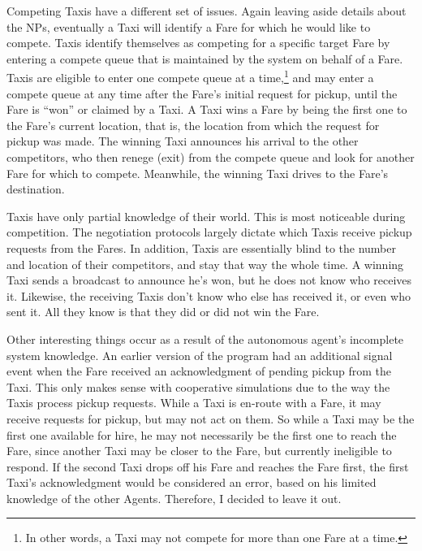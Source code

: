 \documentclass[11pt,letterpaper,onecolumn,twoside,openright,draft]{report}
\begin{document}
Competing Taxis have a different set of issues.
Again leaving aside details about the NPs, eventually a Taxi will identify a Fare for which he would like to compete.
Taxis identify themselves as competing for a specific target Fare by entering a compete queue that is maintained by the system on behalf of a Fare.
Taxis are eligible to enter one compete queue at a time,\footnote{In other words, a Taxi may not compete for more than one Fare at a time.} and may enter a compete queue at any time after the Fare's initial request for pickup, until the Fare is ``won'' or claimed by a Taxi.
A Taxi wins a Fare by being the first one to the Fare's current location, that is, the location from which the request for pickup was made.
The winning Taxi announces his arrival to the other competitors, who then renege (exit) from the compete queue and look for another Fare for which to compete.
Meanwhile, the winning Taxi drives to the Fare's destination.

Taxis have only partial knowledge of their world.
This is most noticeable during competition.
The negotiation protocols largely dictate which Taxis receive pickup requests from the Fares.
In addition, Taxis are essentially blind to the number and location of their competitors, and stay that way the whole time.
A winning Taxi sends a broadcast to announce he's won, but he does not know who receives it.
Likewise, the receiving Taxis don't know who else has received it, or even who sent it.
All they know is that they did or did not win the Fare.

Other interesting things occur as a result of the autonomous agent's incomplete system knowledge.
An earlier version of the program had an additional signal event when the Fare received an acknowledgment of pending pickup from the Taxi.
This only makes sense with cooperative simulations due to the way the Taxis process pickup requests.
While a Taxi is en-route with a Fare, it may receive requests for pickup, but may not act on them.
So while a Taxi may be the first one available for hire, he may not necessarily be the first one to reach the Fare, since another Taxi may be closer to the Fare, but currently ineligible to respond.
If the second Taxi drops off his Fare and reaches the Fare first, the first Taxi's acknowledgment would be considered an error, based on his limited knowledge of the other Agents.
Therefore, I decided to leave it out.
\end{document}
